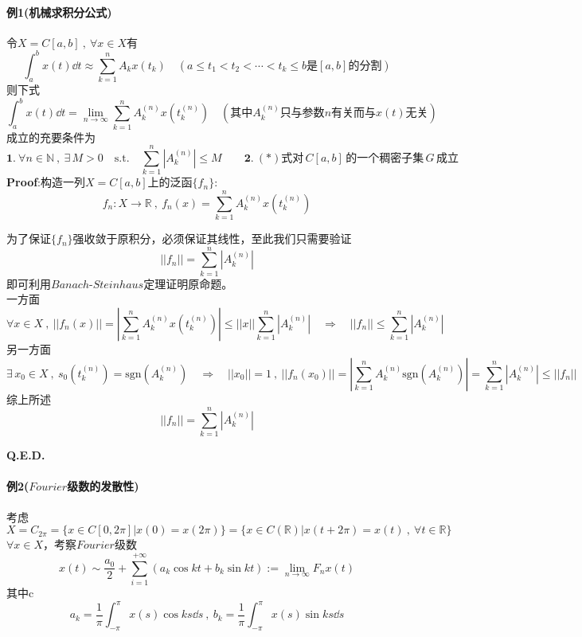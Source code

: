\paragraph*{例1(机械求积分公式)} \quad 令$X=C[a,b] \ , \ \forall x \in X$有
\[\int_a^bx(t)\dd t \approx \sum_{k=1}^nA_kx(t_k) \quad (a \leq t_1<t_2<\cdots<t_k\leq b\text{是}[a,b]\text{的分割})\]
则下式
\[\int_a^bx(t)\dd t=\lim_{n \to \infty}\sum_{k=1}^nA_k^{(n)}x(t_k^{(n)}) \quad (\text{其中}A_k^{(n)}\text{只与参数}n\text{有关而与}x(t)\text{无关}) \tag{*}\]
成立的充要条件为
\[\mathbf{1.} \ \forall n \in \mathbb{N} \ , \ \exists \, M>0 \quad \text{s.t.} \quad \sum_{k=1}^n\left|A_k^{(n)}\right| \leq M \qquad \mathbf{2.} \ (*)\text{式对} \, C[a,b] \, \text{的一个稠密子集} \, G \, \text{成立}\]
\textbf{Proof}:构造一列$X=C[a,b]$上的泛函$\{f_n\}$:
\[f_n:X \to \mathbb{R} \ , \ f_n(x)=\sum_{k=1}^nA_k^{(n)}x(t_k^{(n)})\]

为了保证$\{f_n\}$强收敛于原积分，必须保证其线性，至此我们只需要验证
\[||f_n||=\sum_{k=1}^n\left|A_k^{(n)}\right|\]
即可利用$Banach$-$Steinhaus$定理证明原命题。\\
一方面
\[\forall x \in X \ , \ ||f_n(x)||=\left|\sum_{k=1}^nA_k^{(n)}x(t_k^{(n)})\right| \leq ||x||\sum_{k=1}^n\left|A_k^{(n)}\right| \quad \Rightarrow \quad ||f_n|| \leq \sum_{k=1}^n\left|A_k^{(n)}\right|\]
另一方面
\[\exists \, x_0 \in X \ , \ s_0(t_k^{(n)})=\text{sgn}(A_k^{(n)}) \quad \Rightarrow \quad ||x_0||=1 \ , \ ||f_n(x_0)||=\left|\sum_{k=1}^nA_k^{(n)}\text{sgn}(A_k^{(n)})\right|=\sum_{k=1}^n\left|A_k^{(n)}\right| \leq ||f_n||\]
综上所述
\[||f_n||=\sum_{k=1}^n\left|A_k^{(n)}\right|\]

\textbf{Q.E.D.}

\paragraph*{例2($Fourier$级数的发散性)} \quad 考虑
\[X=C_{2\pi}=\{x \in C[0,2\pi]|x(0)=x(2\pi)\}=\{x \in C(\mathbb{R})|x(t+2\pi)=x(t) \ , \ \forall t \in \mathbb{R}\}\]
$\forall x \in X$，考察$Fourier$级数
\[x(t) \sim \frac{a_0}{2}+\sum_{i=1}^{+\infty}(a_k \cos kt+b_k \sin kt):=\lim_{n \to \infty}F_nx(t)\]
其中c
\[a_k=\frac{1}{\pi}\int_{-\pi}^{\pi}x(s) \cos ks \dd s \ , \ b_k=\frac{1}{\pi}\int_{-\pi}^{\pi}x(s) \sin ks \dd s\]

